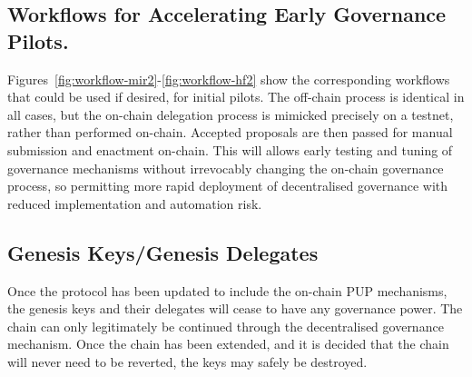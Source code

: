 \subsection{Workflows for Accelerating Early Governance Pilots.}
\label{sect:pilot-workflows}

Figures~\ref{fig:workflow-mir2}-\ref{fig:workflow-hf2} show the corresponding  workflows that could be used if desired,
for initial pilots.  The off-chain process is identical in all cases, but the on-chain delegation process is mimicked precisely on a testnet, rather than performed
on-chain.  Accepted proposals are then passed for manual submission and enactment on-chain.  This will allows early testing and tuning of governance mechanisms without
irrevocably changing the on-chain governance process, so permitting more rapid deployment of decentralised governance with reduced implementation and automation risk.

\subsection{Genesis Keys/Genesis Delegates}

Once the protocol has been updated to include the on-chain PUP mechanisms, the
genesis keys and their delegates will cease to have any governance power.  The
chain can only legitimately be continued through the decentralised governance
mechanism.  Once the chain has been extended, and it is decided that the chain
will never need to be reverted, the keys may safely be destroyed.
